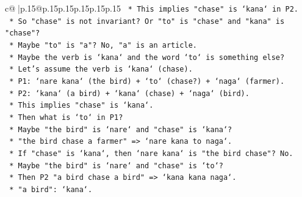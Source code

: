 \documentclass{article}
\begin{document}
{\begin{supertabular}{c@{$\;$}|p{.15\linewidth}@{}p{.15\linewidth}p{.15\linewidth}p{.15\linewidth}p{.15\linewidth}p{.15\linewidth}}
{{{\texttt{                                                                            *   This implies "chase" is `kana` in P2.} \\
\texttt{                                                                            *   So "chase" is not invariant? Or "to" is "chase" and "kana" is "chase"?} \\
\texttt{                                                                            *   Maybe "to" is "a"? No, "a" is an article.} \\
\texttt{                                                                            *   Maybe the verb is `kana` and the word `to` is something else?} \\
\texttt{                                                                            *   Let's assume the verb is `kana` (chase).} \\
\texttt{                                                                            *   P1: `nare kana` (the bird) + `to` (chase?) + `naga` (farmer).} \\
\texttt{                                                                            *   P2: `kana` (a bird) + `kana` (chase) + `naga` (bird).} \\
\texttt{                                                                            *   This implies "chase" is `kana`.} \\
\texttt{                                                                            *   Then what is `to` in P1?} \\
\texttt{                                                                            *   Maybe "the bird" is `nare` and "chase" is `kana`?} \\
\texttt{                                                                            *   "the bird chase a farmer" => `nare kana to naga`.} \\
\texttt{                                                                            *   If "chase" is `kana`, then `nare kana` is "the bird chase"? No.} \\
\texttt{                                                                            *   Maybe "the bird" is `nare` and "chase" is `to`?} \\
\texttt{                                                                            *   Then P2 "a bird chase a bird" => `kana kana naga`.} \\
\texttt{                                                                                *   "a bird": `kana`.} \\
}}}
\end{supertabular}}
\end{document}
